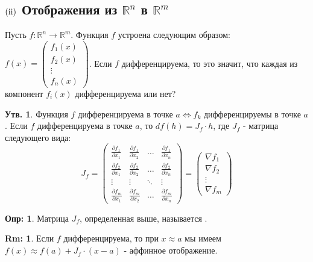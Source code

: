 \documentclass[12pt]{article}
\newcommand{\RN}[1]{%
	\textup{\uppercase\expandafter{\romannumeral#1}}%
}
\newcommand{\MR}{\mathbb{R}}
\theoremstyle{definition}
\newtheorem{defn}{Опр:}
\newtheorem{rem}{Rm:}
\newtheorem{prop}{Утв.}
\begin{document}
\subsection*{$(\RN{2})$ Отображения из $\MR^n$ в $\MR^m$}
Пусть $f \colon \MR^n \to \MR^m$. Функция $f$ устроена следующим образом: $f(x) = \begin{pmatrix}
	f_1(x) \\
	f_2(x) \\
	\vdots \\
	f_n(x)
\end{pmatrix}$. Если $f$ дифференцируема, то это значит, что каждая из компонент $f_i(x)$ дифференцируема или нет?
\begin{prop}
	Функция $f$ дифференцируема в точке $a \Leftrightarrow f_k$ дифференцируемы в точке $a$. Если $f$ дифференцируема в точке $a$, то $df(h) = J_f{\cdot}h$, где $J_f$ - матрица следующего вида:
	$$
		J_f = 
		\begin{pmatrix}
			\tfrac{\partial f_1}{\partial x_1} & \tfrac{\partial f_1}{\partial x_2} & \dotsc & \tfrac{\partial f_1}{\partial x_n} \\
			\tfrac{\partial f_2}{\partial x_1} & \tfrac{\partial f_2}{\partial x_2} & \dotsc & \tfrac{\partial f_2}{\partial x_n} \\
			\vdots & \vdots & \ddots & \vdots \\
			\tfrac{\partial f_m}{\partial x_1} & \tfrac{\partial f_m }{\partial x_2} & \dotsc & \tfrac{\partial f_m}{\partial x_n} 			
		\end{pmatrix} = 
		\begin{pmatrix}
			\nabla f_1 \\
			\nabla f_2 \\
			\vdots \\
			\nabla f_m
		\end{pmatrix}
	$$
\end{prop}
\begin{defn}
	Матрица $J_f$, определенная выше, называется .
\end{defn}
\begin{rem}
	Если $f$ дифференцируема, то при $x \approx a$ мы имеем $f(x) \approx f(a) + J_f{\cdot}(x-a)$ - аффинное отображение.
\end{rem}
\end{document}
